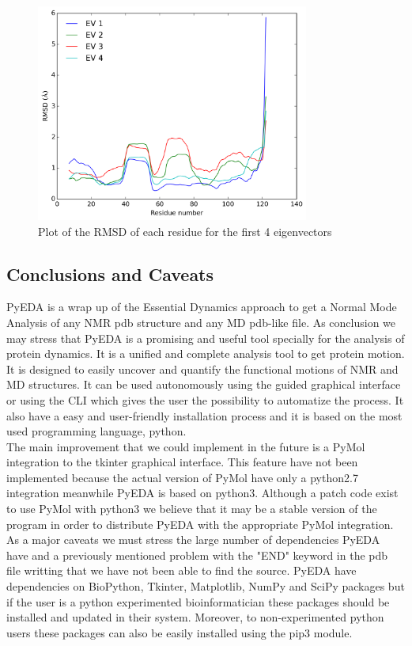 \documentclass[12pt]{article}
\begin{document}
\begin{figure}[h]
\centering
\includegraphics[width=0.8\textwidth]{eig_4_1dpx_resplot.png}
\caption{Plot of the RMSD of each residue for the first 4 eigenvectors}
\label{fig:Md2}
\end{figure}
\subsection{Conclusions and Caveats}
PyEDA is a wrap up of the Essential Dynamics approach to get a Normal Mode Analysis of any NMR pdb structure and any MD pdb-like file. As conclusion we may stress that PyEDA is a promising and useful tool specially for the analysis of protein dynamics.  It is a unified and complete analysis tool to get protein motion. It is designed to easily uncover and quantify the functional motions of NMR and MD structures. It can be used autonomously using the guided graphical interface or using the CLI which gives the user the possibility to automatize the process. It also have a easy and user-friendly installation process and it is based on the most used programming language, python. \\

The main improvement that we could implement in the future is a PyMol integration to the tkinter graphical interface. This feature have not been implemented because the actual version of PyMol have only a python2.7 integration meanwhile PyEDA is based on python3. Although a patch code exist to use PyMol with python3 we believe that it may be a stable version of the program in order to distribute PyEDA with the appropriate PyMol integration. \\

As a major caveats we must stress the large number of dependencies PyEDA have and a previously mentioned problem with the "END" keyword in the pdb file writting that we have not been able to find the source. PyEDA have dependencies on  BioPython\citep{Cock2009}, Tkinter, Matplotlib\citep{Hunter2007}, NumPy and SciPy\citep{VanderWalt2011} packages but if the user is a python experimented bioinformatician these packages should be installed and updated in their system. Moreover, to non-experimented python users these packages can also be easily installed using the pip3 module.\\ 
\end{document}
